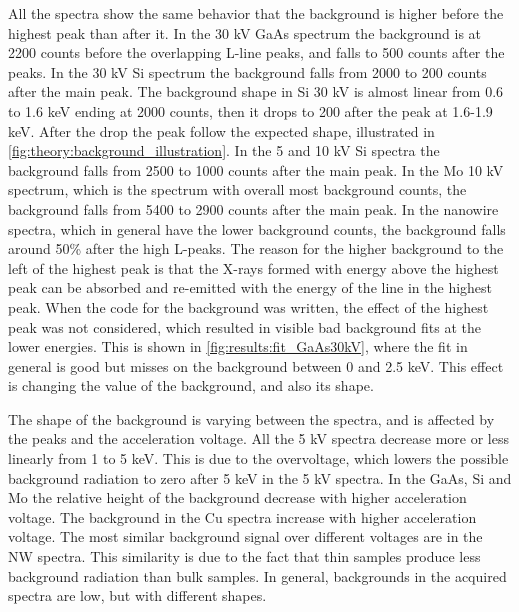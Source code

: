 All the spectra show the same behavior that the background is higher before the highest peak than after it.
In the 30 kV GaAs spectrum the background is at 2200 counts before the overlapping L-line peaks, and falls to 500 counts after the peaks.
In the 30 kV Si spectrum the background falls from 2000 to 200 counts after the main peak.
The background shape in Si 30 kV is almost linear from 0.6 to 1.6 keV ending at 2000 counts, then it drops to 200 after the peak at 1.6-1.9 keV.
After the drop the peak follow the expected shape, illustrated in \cref{fig:theory:background_illustration}.
In the 5 and 10 kV Si spectra the background falls from 2500 to 1000 counts after the main peak.
In the Mo 10 kV spectrum, which is the spectrum with overall most background counts, the background falls from 5400 to 2900 counts after the main peak.
In the nanowire spectra, which in general have the lower background counts, the background falls around 50\% after the high L-peaks.
The reason for the higher background to the left of the highest peak is that the X-rays formed with energy above the highest peak can be absorbed and re-emitted with the energy of the line in the highest peak.
When the code for the background was written, the effect of the highest peak was not considered, which resulted in visible bad background fits at the lower energies.
This is shown in \cref{fig:results:fit_GaAs30kV}, where the fit in general is good but misses on the background between 0 and 2.5 keV.
This effect is changing the value of the background, and also its shape.


The shape of the background is varying between the spectra, and is affected by the peaks and the acceleration voltage.
All the 5 kV spectra decrease more or less linearly from 1 to 5 keV.
This is due to the overvoltage, which lowers the possible background radiation to zero after 5 keV in the 5 kV spectra.
In the GaAs, Si and Mo the relative height of the background decrease with higher acceleration voltage.
The background in the Cu spectra increase with higher acceleration voltage.
The most similar background signal over different voltages are in the NW spectra. %
This similarity is due to the fact that thin samples produce less background radiation than bulk samples.
In general, backgrounds in the acquired spectra are low, but with different shapes.



